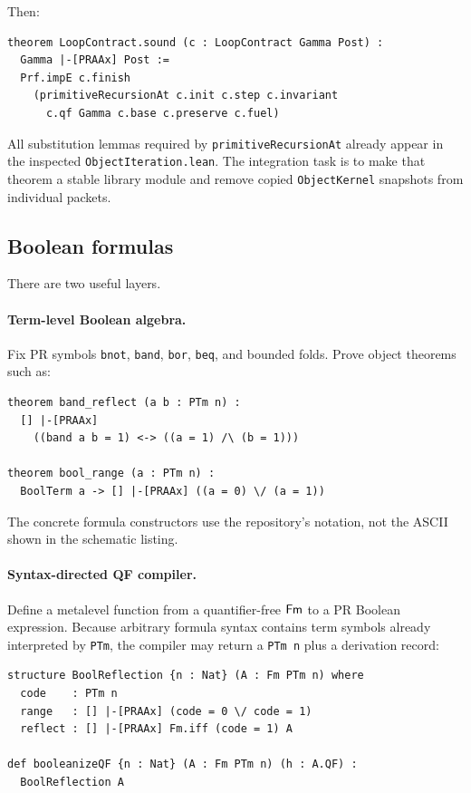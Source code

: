 Then:

\begin{lstlisting}[language={}]
theorem LoopContract.sound (c : LoopContract Gamma Post) :
  Gamma |-[PRAAx] Post :=
  Prf.impE c.finish
    (primitiveRecursionAt c.init c.step c.invariant
      c.qf Gamma c.base c.preserve c.fuel)
\end{lstlisting}

All substitution lemmas required by \texttt{primitiveRecursionAt} already appear in the inspected \texttt{ObjectIteration.lean}.  The integration task is to make that theorem a stable library module and remove copied \texttt{ObjectKernel} snapshots from individual packets.

\subsection{Boolean formulas}

There are two useful layers.

\paragraph{Term-level Boolean algebra.}
Fix PR symbols \texttt{bnot}, \texttt{band}, \texttt{bor}, \texttt{beq}, and bounded folds.  Prove object theorems such as:

\begin{lstlisting}[language={}]
theorem band_reflect (a b : PTm n) :
  [] |-[PRAAx]
    ((band a b = 1) <-> ((a = 1) /\ (b = 1)))

theorem bool_range (a : PTm n) :
  BoolTerm a -> [] |-[PRAAx] ((a = 0) \/ (a = 1))
\end{lstlisting}

The concrete formula constructors use the repository's notation, not the ASCII shown in the schematic listing.

\paragraph{Syntax-directed QF compiler.}
Define a metalevel function from a quantifier-free \(\mathsf{Fm}\) to a PR Boolean expression.  Because arbitrary formula syntax contains term symbols already interpreted by \texttt{PTm}, the compiler may return a \texttt{PTm n} plus a derivation record:

\begin{lstlisting}[language={}]
structure BoolReflection {n : Nat} (A : Fm PTm n) where
  code    : PTm n
  range   : [] |-[PRAAx] (code = 0 \/ code = 1)
  reflect : [] |-[PRAAx] Fm.iff (code = 1) A

def booleanizeQF {n : Nat} (A : Fm PTm n) (h : A.QF) :
  BoolReflection A
\end{lstlisting}

